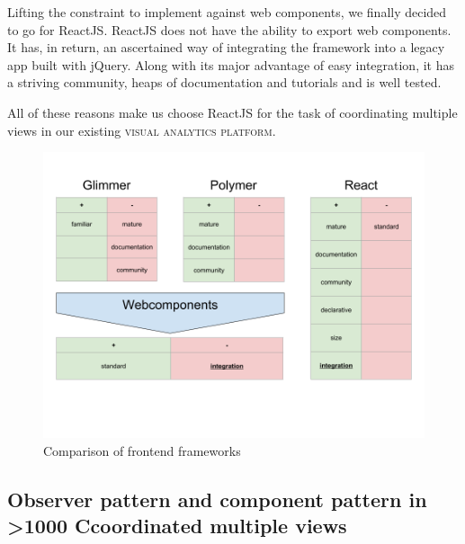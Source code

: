 \documentclass{article}
\newcommand{\visan}{\textsc{visual analytics platform}}
\newcommand\hmm[1]{\ifnum\ifhmode\spacefactor\else2000\fi>1000 \uppercase{#1}\else#1\fi}
\newcommand{\cmvs}{\hmm{c}oordinated multiple views}
\begin{document}
Lifting the constraint to implement against web components, we finally decided to go for ReactJS\cite{React2017}.
ReactJS does not have the ability to export web components.
It has, in return, an ascertained way of integrating the framework into a legacy app built with jQuery.
Along with its major advantage of easy integration, it has a striving community, heaps of documentation and tutorials and is well tested.

All of these reasons make us choose ReactJS for the task of coordinating multiple views in our existing \visan{}.




\begin{figure}[h!]
  \centering
  \includegraphics[width=\textwidth]{images/frontend-frameworks.png}
  \caption{Comparison of frontend frameworks}
  \label{fig:implementation:frontend-frameworks}
\end{figure}

\subsection{Observer pattern and component pattern in \cmvs{}}
\end{document}
